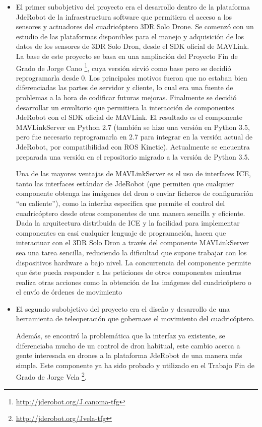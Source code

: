 \begin{itemize}
\item El primer subobjetivo del proyecto era el desarrollo dentro de la plataforma JdeRobot de la infraestructura software que permitiera el acceso a los sensores y actuadores del cuadricóptero 3DR Solo Drone. Se comenzó con un estudio de las plataformas disponibles para el manejo y adquisición de los datos de los sensores de 3DR Solo Dron, desde el SDK oficial de MAVLink. La base de este proyecto se basa en una ampliación del Proyecto Fin de Grado de Jorge Cano \footnote{\url{http://jderobot.org/J.canoma-tfg}}, cuya versión sirvió como base pero se decidió reprogramarla desde 0. Los principales motivos fueron que no estaban bien diferenciadas las partes de servidor y cliente, lo cual era una fuente de problemas a la hora de codificar futuras mejoras. Finalmente se decidió desarrollar un envoltorio que permitiera la interacción de componentes JdeRobot con el SDK oficial de MAVLink. El resultado es el componente MAVLinkServer en Python 2.7 (también se hizo una versión en Python 3.5, pero fue necesario reprogramarla en 2.7 para integrar en la versión actual de JdeRobot, por compatibilidad con ROS Kinetic). Actualmente se encuentra preparada una versión en el repositorio migrado a la versión de Python 3.5.

Una de las mayores ventajas de MAVLinkServer es el uso de interfaces ICE, tanto las interfaces estándar de JdeRobot (que permiten que cualquier componente obtenga las imágenes del dron o enviar ficheros de configuración “en caliente”), como la interfaz especifica que permite el control del cuadricóptero desde otros componentes de una manera sencilla y eficiente. Dada la arquitectura
distribuida de ICE y la facilidad para implementar componentes en casi cualquier lenguaje de programación, hacen que interactuar con el 3DR Solo Dron a través del componente MAVLinkServer sea una tarea sencilla, reduciendo la dificultad que supone trabajar con los dispositivos hardware a bajo nivel. La concurrencia del componente permite que éste pueda responder a las peticiones de otros componentes mientras realiza otras acciones como la obtención de las imágenes del cuadricóptero o el envío de órdenes de movimiento
\item El segundo subobjetivo del proyecto era el diseño y desarrollo de una herramienta de teleoperación que gobernase el movimiento del cuadricóptero.

Además, se encontró la problemática que la interfaz ya existente, se diferenciaba mucho de un control de dron habitual, este cambio acerca a gente interesada en drones a la plataforma JdeRobot de una manera más simple. Este componente ya ha sido probado y utilizado en el Trabajo Fin de Grado de Jorge Vela \footnote{\url{http://jderobot.org/Jvela-tfg}}\cite{jvelaTFG}.


\end{itemize}
